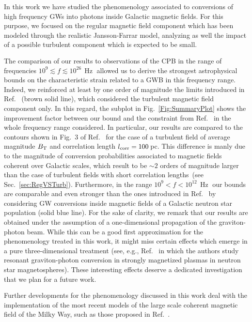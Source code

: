\documentclass[twocolumn,superscriptaddress,floatfix,preprintnumbers, nofootinbib,hyperref]{revtex4-2}
\DeclareMathOperator{\Hz}{Hz}
\begin{document}
In this work we have studied the phenomenology associated to conversions of high frequency GWs into photons inside Galactic magnetic fields. For this purpose, we focused on the regular magnetic field component which has been modeled through the realistic Jansson-Farrar model, analyzing as well the impact of a possible turbulent component which is expected to be small. 
%

The comparison of our results to observations of the CPB in the range of frequencies ${10^9\lesssim f\lesssim10^{26}\,\Hz}$ allowed us to derive the strongest astrophysical bounds on the characteristic strain related to a GWB in this frequency range. 
Indeed, we reinforced at least by one order of magnitude the limits introduced in Ref.~\cite{Ito:2023nkq} (brown solid line), which considered the turbulent magnetic field component only. In this regard, the subplot in Fig.~\ref{Fig:SummaryPlot} shows the improvement factor between our bound and the constraint from Ref.~\cite{Ito:2023nkq} in the whole frequency range considered. In particular, our results are compared to the contours shown in Fig.~3 of Ref.~\cite{Ito:2023nkq} for the case of a turbulent field of average magnitude $B_{\rm T}$ and correlation length $l_{\rm corr}=100\,$pc.
This difference is manly due to the magnitude of conversion probabilities associated to magnetic fields coherent over Galactic scales, which result to be $\sim 2$ orders of magnitude larger than the case of turbulent fields with short correlation lengths~(see Sec.~\ref{sec:RegVSTurb}).
Furthermore, in the range $10^{9}<f<10^{12}\,\Hz$ our bounds are comparable and even stronger than the ones introduced in Ref.~\cite{Dandoy:2024oqg} by considering GW conversions inside magnetic fields of a Galactic neutron star population (solid blue line). For the sake of clarity, we remark that our results are obtained under the assumption of a one-dimensional propagation of the graviton-photon beam. While this can be a good first approximation for the phenomenology treated in this work, it might miss certain effects which emerge in a pure three-dimensional treatment (see, e.g., Ref.~\cite{McDonald:2024nxj} in which the authors study resonant graviton-photon conversion in strongly magnetized plasmas in neutron star magnetospheres). These interesting effects deserve a dedicated investigation that we plan for a future work.

Further developments for the phenomenology discussed in this work deal with the implementation of the most recent models of the large scale coherent magnetic field of the Milky Way, such as those proposed in Ref.~\cite{Unger:2023lob}.
\end{document}
